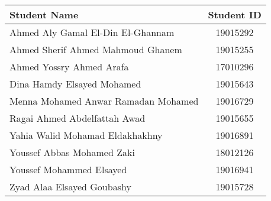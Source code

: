 \begin{titlepage}

\begin{center}





{\makeatletter
\largetitlestyle\fontsize{42}{42}\selectfont\@title
\makeatother}

\vspace{5mm}

{\makeatletter
\ifdefvoid{\@subtitle}{}{\bigskip\titlestyle\fontsize{20}{20}\selectfont\@subtitle}
\makeatother}





\vspace{12mm}

\setlength\extrarowheight{7pt}
\begin{tabular}{lc}
    {\large Student Name} & {\large Student ID} \\\midrule
    {\large Ahmed Aly Gamal El-Din El-Ghannam} & {\large 19015292} \\
    {\large Ahmed Sherif Ahmed Mahmoud Ghanem} & {\large 19015255} \\
    {\large Ahmed Yossry Ahmed Arafa } & {\large 17010296} \\
    {\large Dina Hamdy Elsayed Mohamed} & {\large 19015643} \\
    {\large Menna Mohamed Anwar Ramadan Mohamed} & {\large 19016729} \\
    {\large Ragai Ahmed Abdelfattah Awad} & {\large 19015655} \\
    {\large Yahia Walid Mohamad Eldakhakhny} & {\large 19016891} \\
    {\large Youssef Abbas Mohamed Zaki} & {\large 18012126} \\
    {\large Youssef Mohammed Elsayed} & {\large 19016941} \\
    {\large Zyad Alaa Elsayed Goubashy} & {\large 19015728} \\
\end{tabular}


\end{center}
\end{titlepage}
